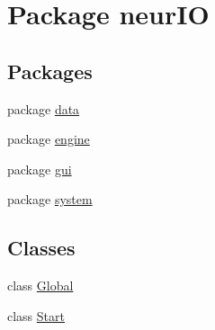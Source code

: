 \hypertarget{namespaceneur_i_o}{}\section{Package neur\+IO}
\label{namespaceneur_i_o}
\subsection*{Packages}
\begin{DoxyCompactItemize}
\item 
package \hyperlink{namespaceneur_i_o_1_1data}{data}
\item 
package \hyperlink{namespaceneur_i_o_1_1engine}{engine}
\item 
package \hyperlink{namespaceneur_i_o_1_1gui}{gui}
\item 
package \hyperlink{namespaceneur_i_o_1_1system}{system}
\end{DoxyCompactItemize}
\subsection*{Classes}
\begin{DoxyCompactItemize}
\item 
class \hyperlink{classneur_i_o_1_1_global}{Global}
\item 
class \hyperlink{classneur_i_o_1_1_start}{Start}
\end{DoxyCompactItemize}

